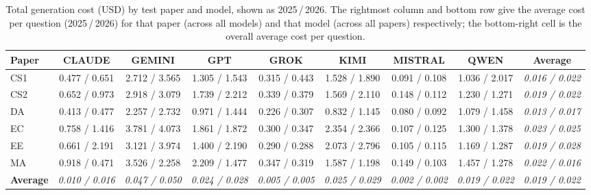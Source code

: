 
\begin{table}[htbp]
\centering
\scriptsize
\setlength{\tabcolsep}{4pt}
\begin{tabular}{lccccccc|c}
\toprule
\textbf{Paper} & \textbf{CLAUDE} & \textbf{GEMINI} & \textbf{GPT} & \textbf{GROK} & \textbf{KIMI} & \textbf{MISTRAL} & \textbf{QWEN} & \textbf{Average} \\
\midrule
CS1 & 0.477 / 0.651 & 2.712 / 3.565 & 1.305 / 1.543 & 0.315 / 0.443 & 1.528 / 1.890 & 0.091 / 0.108 & 1.036 / 2.017 & \textit{0.016 / 0.022} \\
CS2 & 0.652 / 0.973 & 2.918 / 3.079 & 1.739 / 2.212 & 0.339 / 0.379 & 1.569 / 2.110 & 0.148 / 0.112 & 1.230 / 1.271 & \textit{0.019 / 0.022} \\
DA & 0.413 / 0.477 & 2.257 / 2.732 & 0.971 / 1.444 & 0.226 / 0.307 & 0.832 / 1.145 & 0.080 / 0.092 & 1.079 / 1.458 & \textit{0.013 / 0.017} \\
EC & 0.758 / 1.416 & 3.781 / 4.073 & 1.861 / 1.872 & 0.300 / 0.347 & 2.354 / 2.366 & 0.107 / 0.125 & 1.300 / 1.378 & \textit{0.023 / 0.025} \\
EE & 0.661 / 2.191 & 3.121 / 3.974 & 1.400 / 2.190 & 0.290 / 0.288 & 2.073 / 2.796 & 0.105 / 0.115 & 1.169 / 1.287 & \textit{0.019 / 0.028} \\
MA & 0.918 / 0.471 & 3.526 / 2.258 & 2.209 / 1.477 & 0.347 / 0.319 & 1.587 / 1.198 & 0.149 / 0.103 & 1.457 / 1.278 & \textit{0.022 / 0.016} \\
\midrule
\textbf{Average} & \textit{0.010 / 0.016} & \textit{0.047 / 0.050} & \textit{0.024 / 0.028} & \textit{0.005 / 0.005} & \textit{0.025 / 0.029} & \textit{0.002 / 0.002} & \textit{0.019 / 0.022} & \textit{0.019 / 0.022} \\
\bottomrule
\end{tabular}
\caption{Total generation cost (USD) by test paper and model, shown as 2025\,/\,2026. The rightmost column and bottom row give the average cost per question (2025\,/\,2026) for that paper (across all models) and that model (across all papers) respectively; the bottom-right cell is the overall average cost per question.}
\label{tab:generation-cost}
\end{table}


